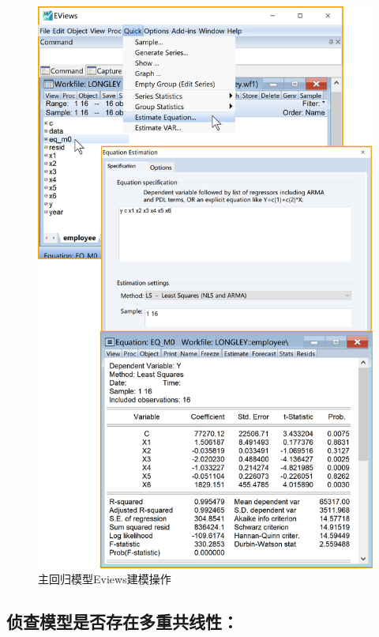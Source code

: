\documentclass[12pt,(landscape,a4paper),(portrait,a4paper)]{article}
\begin{document}
\begin{figure}

{\centering \includegraphics[width=8in]{picture/lab5-multilinearity/1-main-model} 

}

\caption{主回归模型Eviews建模操作}\label{fig:fig-main}
\end{figure}

\subsection{侦查模型是否存在多重共线性：}
\end{document}
